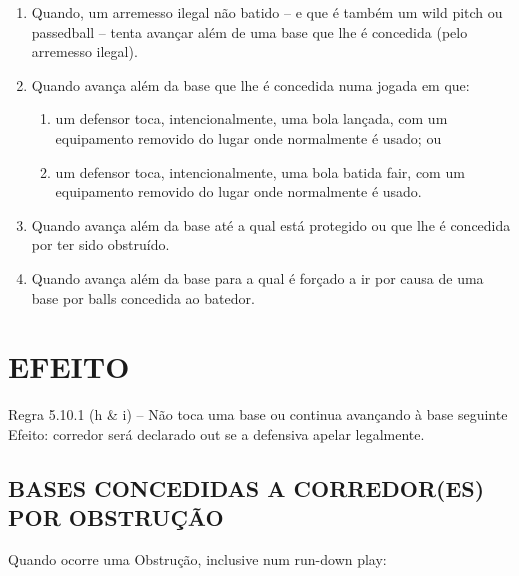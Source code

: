 \begin{enumerate}[label=(\alph*)]
	\item   Quando, um arremesso ilegal não batido -- e que é também um \gls{wild pitch} ou	 \gls{passedball} -- tenta avançar além de uma base que lhe é concedida (pelo arremesso ilegal).

	\item   Quando avança além da base que lhe é concedida numa jogada em que:

	\begin{enumerate}[label=\roman*.]
	 	\item um defensor toca, intencionalmente, uma bola lançada, com um equipamento removido do lugar onde normalmente é usado; ou
		\item um defensor toca, intencionalmente, uma bola batida \gls{fair}, com um  equipamento removido do lugar onde normalmente é usado.
	\end{enumerate}

	\item Quando avança além da base até a qual está protegido ou que lhe é concedida por ter sido obstruído.
	\item Quando avança além da base para a qual é forçado a ir por causa de uma base por \glspl{ball} concedida ao batedor.

\end{enumerate}

\section*{EFEITO}

Regra 5.10.1 (h \& i) -- Não toca uma base ou continua avançando à base seguinte
 Efeito: corredor será declarado \gls{out} se a defensiva apelar legalmente.

\subsection{BASES CONCEDIDAS A CORREDOR(ES) POR OBSTRUÇÃO}

Quando ocorre uma Obstrução, inclusive num \gls{run-down play}:

